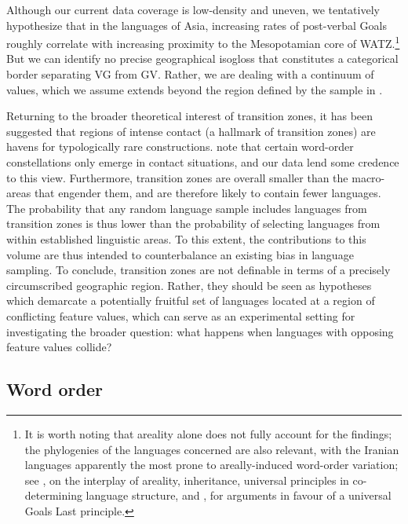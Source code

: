 \documentclass[output=paper,colorlinks,citecolor=brown,collectionchapter]{langscibook}
\begin{document}
Although our current data coverage is low-density and uneven, we tentatively hypothesize that in the  languages of Asia, increasing rates of post-verbal Goals roughly correlate with increasing proximity to the Mesopotamian core of WATZ.\footnote{It is worth noting that areality alone does not fully account for the findings; the phylogenies of the languages concerned are also relevant, with the Iranian languages apparently the most prone to areally-induced word-order variation; see \citet{haig_which_2023}, \citet[42]{bickel_areas_2017} on the interplay of areality, inheritance, universal principles in co-determining language structure, and \citet{haig_goals_2023}, for arguments in favour of a universal Goals Last principle.} But we can identify no precise geographical isogloss that constitutes a categorical border separating VG from GV. Rather, we are dealing with a continuum of values, which we assume extends beyond the region defined by the sample in .

Returning to the broader theoretical interest of transition zones, it has been suggested that regions of intense contact (a hallmark of transition zones) are havens for typologically rare constructions. \citet[137]{harris_historical_1995} note that certain word-order constellations only emerge in contact situations, and our data lend some credence to this view.  Furthermore, transition zones are overall smaller than the macro-areas that engender them, and are therefore likely to contain fewer languages. The probability that any random language sample includes languages from transition zones is thus lower than the probability of selecting languages from within established linguistic areas. To this extent, the contributions to this volume are thus intended to counterbalance an existing bias in language sampling. To conclude, transition zones are not definable in terms of a precisely circumscribed geographic region. Rather, they should be seen as hypotheses which demarcate a potentially fruitful set of languages located at a region of conflicting feature values, which can serve as an experimental setting for investigating the broader question: what happens when languages with opposing feature values collide? 

\subsection{Word order}\label{Intro:ss:1.3}
\end{document}
